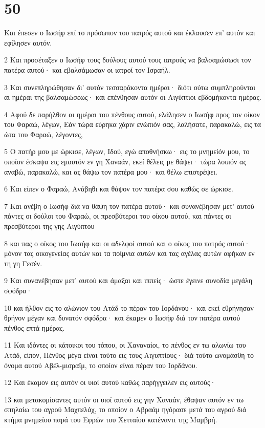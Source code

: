 \chapter{50}

\par Και έπεσεν ο Ιωσήφ επί το πρόσωπον του πατρός αυτού και έκλαυσεν επ' αυτόν και εφίλησεν αυτόν.
\par 2 Και προσέταξεν ο Ιωσήφ τους δούλους αυτού τους ιατρούς να βαλσαμώσωσι τον πατέρα αυτού· και εβαλσάμωσαν οι ιατροί τον Ισραήλ.
\par 3 Και συνεπληρώθησαν δι' αυτόν τεσσαράκοντα ημέραι· διότι ούτω συμπληρούνται αι ημέραι της βαλσαμώσεως· και επένθησαν αυτόν οι Αιγύπτιοι εβδομήκοντα ημέρας.
\par 4 Αφού δε παρήλθον αι ημέραι του πένθους αυτού, ελάλησεν ο Ιωσήφ προς τον οίκον του Φαραώ, λέγων, Εάν τώρα εύρηκα χάριν ενώπιόν σας, λαλήσατε, παρακαλώ, εις τα ώτα του Φαραώ, λέγοντες,
\par 5 Ο πατήρ μου με ώρκισε, λέγων, Ιδού, εγώ αποθνήσκω· εις το μνημείόν μου, το οποίον έσκαψα εις εμαυτόν εν γη Χαναάν, εκεί θέλεις με θάψει· τώρα λοιπόν ας αναβώ, παρακαλώ, και ας θάψω τον πατέρα μου· και θέλω επιστρέψει.
\par 6 Και είπεν ο Φαραώ, Ανάβηθι και θάψον τον πατέρα σου καθώς σε ώρκισε.
\par 7 Και ανέβη ο Ιωσήφ διά να θάψη τον πατέρα αυτού· και συνανέβησαν μετ' αυτού πάντες οι δούλοι του Φαραώ, οι πρεσβύτεροι του οίκου αυτού, και πάντες οι πρεσβύτεροι της γης Αιγύπτου
\par 8 και πας ο οίκος του Ιωσήφ και οι αδελφοί αυτού και ο οίκος του πατρός αυτού· μόνον τας οικογενείας αυτών και τα ποίμνια αυτών και τας αγέλας αυτών αφήκαν εν τη γη Γεσέν.
\par 9 Και συνανέβησαν μετ' αυτού και άμαξαι και ιππείς· ώστε έγεινε συνοδία μεγάλη σφόδρα·
\par 10 και ήλθον εις το αλώνιον του Ατάδ το πέραν του Ιορδάνου· και εκεί εθρήνησαν θρήνον μέγαν και δυνατόν σφόδρα· και έκαμεν ο Ιωσήφ διά τον πατέρα αυτού πένθος επτά ημέρας.
\par 11 Και ιδόντες οι κάτοικοι του τόπου, οι Χαναναίοι, το πένθος εν τω αλωνίω του Ατάδ, είπον, Πένθος μέγα είναι τούτο εις τους Αιγυπτίους· διά τούτο ωνομάσθη το όνομα αυτού Αβέλ-μισραΐμ, το οποίον είναι πέραν του Ιορδάνου.
\par 12 Και έκαμον εις αυτόν οι υιοί αυτού καθώς παρήγγειλεν εις αυτούς·
\par 13 και μετακομίσαντες αυτόν οι υιοί αυτού εις γην Χαναάν, έθαψαν αυτόν εν τω σπηλαίω του αγρού Μαχπελάχ, το οποίον ο Αβραάμ ηγόρασε μετά του αγρού διά κτήμα μνημείου παρά του Εφρών του Χετταίου κατέναντι της Μαμβρή.
